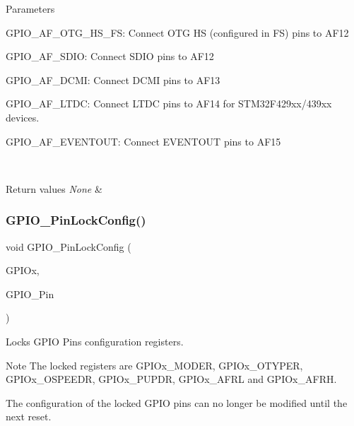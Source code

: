 \begin{DoxyParams}{Parameters}
\begin{DoxyItemize}
 \item G\+P\+I\+O\+\_\+\+A\+F\+\_\+\+O\+T\+G\+\_\+\+H\+S\+\_\+\+FS\+: Connect O\+TG HS (configured in FS) pins to A\+F12 \item G\+P\+I\+O\+\_\+\+A\+F\+\_\+\+S\+D\+IO\+: Connect S\+D\+IO pins to A\+F12 \item G\+P\+I\+O\+\_\+\+A\+F\+\_\+\+D\+C\+MI\+: Connect D\+C\+MI pins to A\+F13 \item G\+P\+I\+O\+\_\+\+A\+F\+\_\+\+L\+T\+DC\+: Connect L\+T\+DC pins to A\+F14 for S\+T\+M32\+F429xx/439xx devices. \item G\+P\+I\+O\+\_\+\+A\+F\+\_\+\+E\+V\+E\+N\+T\+O\+UT\+: Connect E\+V\+E\+N\+T\+O\+UT pins to A\+F15 \end{DoxyItemize}
\\
\hline
\end{DoxyParams}

\begin{DoxyRetVals}{Return values}
{\em None} & \\
\hline
\end{DoxyRetVals}
\mbox{\label{group___g_p_i_o_gad2f2e615928c69fd0d8c641a7cedaafc}} 
\subsubsection{\texorpdfstring{G\+P\+I\+O\+\_\+\+Pin\+Lock\+Config()}{GPIO\_PinLockConfig()}}
{\footnotesize\ttfamily void G\+P\+I\+O\+\_\+\+Pin\+Lock\+Config (\begin{DoxyParamCaption}\item[{G\+P\+I\+O\+\_\+\+Type\+Def $\ast$}]{G\+P\+I\+Ox,  }\item[{uint16\+\_\+t}]{G\+P\+I\+O\+\_\+\+Pin }\end{DoxyParamCaption})}



Locks G\+P\+IO Pins configuration registers. 

\begin{DoxyNote}{Note}
The locked registers are G\+P\+I\+Ox\+\_\+\+M\+O\+D\+ER, G\+P\+I\+Ox\+\_\+\+O\+T\+Y\+P\+ER, G\+P\+I\+Ox\+\_\+\+O\+S\+P\+E\+E\+DR, G\+P\+I\+Ox\+\_\+\+P\+U\+P\+DR, G\+P\+I\+Ox\+\_\+\+A\+F\+RL and G\+P\+I\+Ox\+\_\+\+A\+F\+RH. 

The configuration of the locked G\+P\+IO pins can no longer be modified until the next reset. 
\end{DoxyNote}

